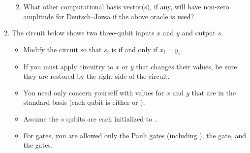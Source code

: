 \documentclass[12pt]{article}
\begin{document}
\begin{enumerate}[font=\bfseries]
\begin{enumerate}[label=\theenumi.\arabic*]
    \item  What other computational basis vector(s), if any, will have non-zero amplitude for Deutsch--Jozsa if the above oracle is used?  
    
\end{enumerate}
\item{} The circuit below shows two three-qubit inputs $x$ and $y$ and output $s$.
\begin{itemize}
    \item Modify the circuit so that $s_i$ is \QOne{} if and only if $x_{i}=y_{i}$.  
    \item If you must apply circuitry to $x$ or $y$ that changes their values, be sure they are restored by the right side of the circuit.
    \item You need only concern yourself with values for $x$ and $y$ that are in the standard \PauliZ{} basis (each qubit is either \QZero{} or \QOne{}).
    \item Assume the $s$ qubits are each initialized to \QZero{}.
    \item For gates, you are allowed only the
    Pauli gates (including \Hadamard{}), the  gate, and the  gates.
\end{itemize}
\BigSkip{}


\end{enumerate}
\end{document}
